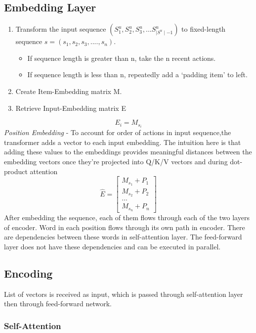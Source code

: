\documentclass[11pt]{article}
\begin{document}
\subsection{Embedding Layer}
	\begin{enumerate}
		\item Transform the input sequence $(S^{u}_{1},S^{u}_{2},S^{u}_{3},...S^{u}_{\mid S^{u} \mid -1})$ to fixed-length sequence $s = (s_{1},s_{2},s_{3},....,s_{n})$.
		\begin{itemize}
			\item If sequence length is greater than n, take the n recent actions.
			\item If sequence length is less than n, repeatedly add a ‘padding item’ to left.
		\end{itemize}	
	 		\item Create Item-Embedding matrix M.
			\item Retrieve Input-Embedding matrix E 
\end{enumerate}	  
	\[	E_{i} = M_{s_{i}} \]
	\emph{Position Embedding} - 
 To account for order of actions in input sequence,the transformer adds a vector to each input embedding. The intuition here is that adding these values to the embeddings provides meaningful distances between the embedding vectors once they’re projected into Q/K/V vectors and during dot-product attention
	\[ 
	\hat E = 
	\begin{bmatrix}
	M_{s_{1}} + P_{1}  \\
	M_{s_{2}} + P_{2} \\
		   ...			\\
	M_{s_{n}} + P_{n}
	\end{bmatrix}
	\]		
	After embedding the sequence, each of them flows through each of the two layers of encoder. Word in each position flows through its own path in encoder. There are dependencies between these words in self-attention layer. The feed-forward layer does not have these dependencies and can be executed in parallel.

\subsection{Encoding}
	\quad List of vectors is received as input, which is passed through self-attention layer then through feed-forward network.
	\subsubsection{Self-Attention}
	
\end{document}
